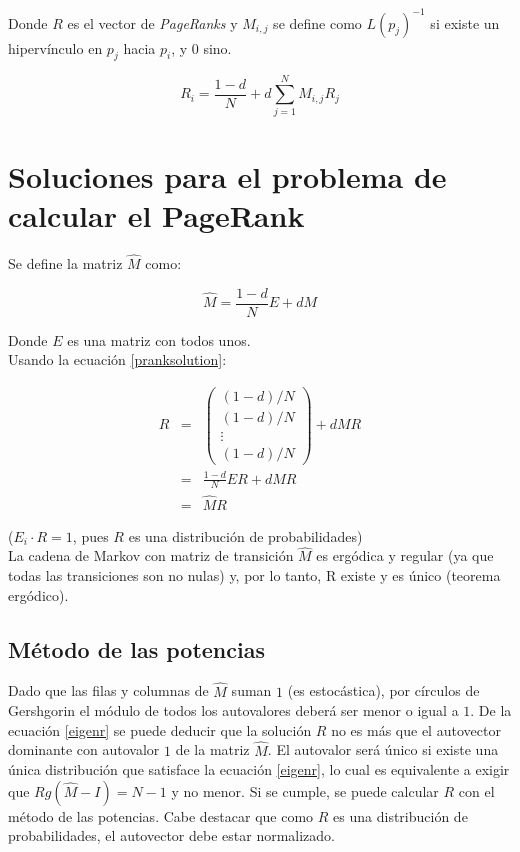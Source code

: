 \documentclass[%
    final,
    notitlepage,
    narroweqnarray,
    inline,
    twoside,
    invited
    ]{lib/ieee}
\begin{document}
Donde $R$ es el vector de \textit{PageRanks} y $M_{i,j}$ se define como $L(p_j)^{-1}$ si existe un hipervínculo en $p_j$ hacia $p_i$, y $0$ sino.

\[
    R_i = \frac{1-d}{N} + d \sum_{j=1}^{N} M_{i,j} R_j
\]

\section{Soluciones para el problema de calcular el PageRank}

Se define la matriz $\widehat{M}$ como:

\begin{equation}\label{mhat}
    \widehat{M} = \frac{1-d}{N}E + dM
\end{equation}

Donde $E$ es una matriz con todos unos.\\

Usando la ecuación \eqref{pranksolution}:

\begin{eqnarray}
    R &=& \begin{pmatrix}
              (1-d)/N \\ (1-d)/N \\ \vdots \\ (1-d)/N
          \end{pmatrix}
          + dMR \nonumber\\
      &=& \frac{1-d}{N}ER + dMR \nonumber\\
      &=& \widehat{M}R \label{eigenr}
\end{eqnarray}

($E_i \cdot R = 1$, pues $R$ es una distribución de probabilidades)\\

La cadena de Markov con matriz de transición $\widehat{M}$ es ergódica y regular (ya que todas las transiciones son no nulas) y, por lo tanto, R existe y es único (teorema ergódico).

\subsection{Método de las potencias}

Dado que las filas y columnas de
$\widehat{M}$ suman $1$ (es estocástica), por círculos de Gershgorin el módulo de todos los autovalores deberá ser menor o igual a $1$.
De la ecuación \eqref{eigenr} se puede deducir que la solución $R$ no es más que el autovector dominante con autovalor $1$ de la matriz $\widehat{M}$.
El autovalor será único si existe una única distribución que satisface la ecuación \eqref{eigenr}, lo cual es equivalente a exigir
que $Rg\left(\widehat{M}-I\right) = N-1$ y no menor.
Si se cumple, se puede calcular $R$ con el método de las potencias. Cabe destacar que como
$R$ es una distribución de probabilidades, el autovector debe estar normalizado.\\
\end{document}
